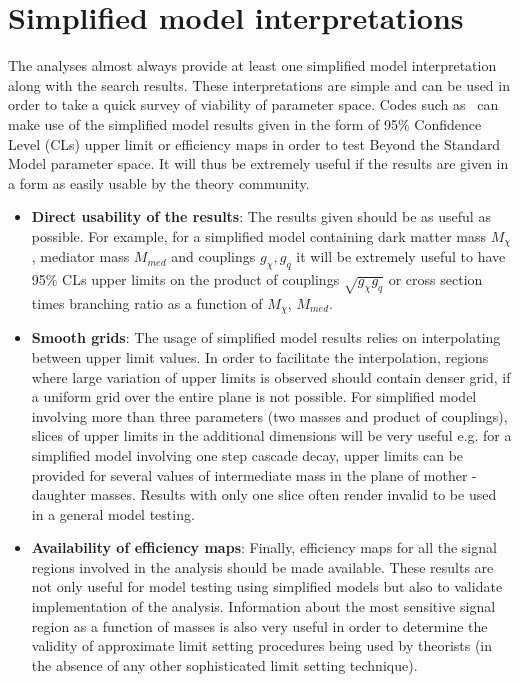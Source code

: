 \section{Simplified model interpretations}
The analyses almost always provide at least one simplified model interpretation along with the search results. These interpretations are simple and can be used in order to take a quick survey of viability of parameter space. Codes such as~\cite{Kraml:2013mwa, Kraml:2014sna, Papucci:2014rja} can make use of the simplified model results given in the form of 95\% Confidence Level (CLs) upper limit  or efficiency maps in order to test Beyond the Standard Model parameter space. It will thus be extremely useful if the results are given in a form as easily usable by the theory community. 
\begin{itemize}
\item \textbf{Direct usability of the results}: The results given should be as useful as possible. For example, for a simplified model containing dark matter mass $M_{\chi}$, mediator mass $M_{med}$ and couplings $g_{\chi}, g_q$ it will be extremely useful to have 95\% CLs upper limits on the product of couplings $\sqrt{g_{\chi}g_q}$ or cross section times branching ratio as a function of $M_{\chi}$, $M_{med}$. 
\item \textbf{Smooth grids}: The usage of simplified model results relies on interpolating between upper limit values. In order to facilitate the interpolation, regions where large variation of upper limits is observed should contain denser grid, if a uniform grid over the entire plane is not possible. For simplified model involving more than three parameters (two masses and product of couplings), slices of upper limits in the additional dimensions will be very useful e.g. for a simplified model involving one step cascade decay, upper limits can be provided for several values of intermediate mass in the plane of mother - daughter masses. Results with only one slice often render invalid to be used in a general model testing.  
\item \textbf{Availability of efficiency maps}: Finally, efficiency maps for all the signal regions involved in the analysis should be made available. These results are not only useful for model testing using simplified models but also to validate implementation of the analysis. Information about the most sensitive signal region as a function of masses is also very useful in order to determine the validity of approximate limit setting procedures being used by theorists (in the absence of any other sophisticated limit setting technique).
\end{itemize}
